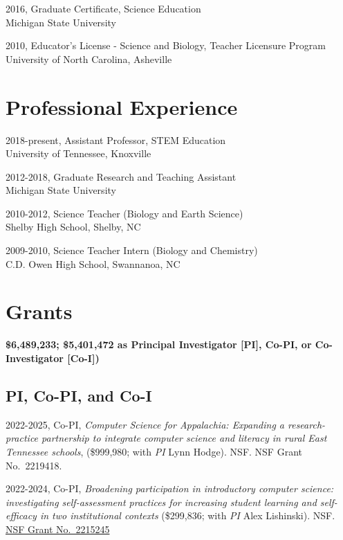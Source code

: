 \documentclass[
  14,
]{article}
\begin{document}
2016, Graduate Certificate, Science Education\\
Michigan State University

2010, Educator's License - Science and Biology, Teacher Licensure
Program\\
University of North Carolina, Asheville

\hypertarget{professional-experience}{%
\section{Professional Experience}\label{professional-experience}}

2018-present, Assistant Professor, STEM Education\\
University of Tennessee, Knoxville

2012-2018, Graduate Research and Teaching Assistant\\
Michigan State University

2010-2012, Science Teacher (Biology and Earth Science)\\
Shelby High School, Shelby, NC

2009-2010, Science Teacher Intern (Biology and Chemistry)\\
C.D. Owen High School, Swannanoa, NC

\hypertarget{grants}{%
\section{Grants}\label{grants}}

\textbf{\$6,489,233; \$5,401,472 as Principal Investigator {[}PI{]},
Co-PI, or Co-Investigator {[}Co-I{]})}

\hypertarget{pi-co-pi-and-co-i}{%
\subsection{PI, Co-PI, and Co-I}\label{pi-co-pi-and-co-i}}

2022-2025, Co-PI, \emph{Computer Science for Appalachia: Expanding a
research-practice partnership to integrate computer science and literacy
in rural East Tennessee schools}, (\$999,980; with \emph{PI} Lynn
Hodge). NSF. NSF Grant No.~2219418.

2022-2024, Co-PI, \emph{Broadening participation in introductory
computer science: investigating self-assessment practices for increasing
student learning and self-efficacy in two institutional contexts}
(\$299,836; with \emph{PI} Alex Lishinski). NSF.
\href{https://www.nsf.gov/awardsearch/showAward?AWD_ID=2215245\&HistoricalAwards=false}{NSF
Grant No.~2215245}
\end{document}
